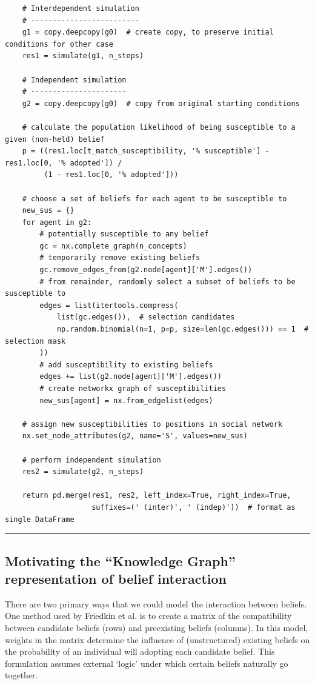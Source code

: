 \documentclass{article}
\begin{document}
\begin{verbatim}
    # Interdependent simulation
    # -------------------------
    g1 = copy.deepcopy(g0)  # create copy, to preserve initial conditions for other case
    res1 = simulate(g1, n_steps)

    # Independent simulation
    # ----------------------
    g2 = copy.deepcopy(g0)  # copy from original starting conditions

    # calculate the population likelihood of being susceptible to a given (non-held) belief
    p = ((res1.loc[t_match_susceptibility, '% susceptible'] - res1.loc[0, '% adopted']) /
         (1 - res1.loc[0, '% adopted']))

    # choose a set of beliefs for each agent to be susceptible to
    new_sus = {}
    for agent in g2:
        # potentially susceptible to any belief
        gc = nx.complete_graph(n_concepts)  
        # temporarily remove existing beliefs
        gc.remove_edges_from(g2.node[agent]['M'].edges())  
        # from remainder, randomly select a subset of beliefs to be susceptible to
        edges = list(itertools.compress(
            list(gc.edges()),  # selection candidates
            np.random.binomial(n=1, p=p, size=len(gc.edges())) == 1  # selection mask
        ))
        # add susceptibility to existing beliefs
        edges += list(g2.node[agent]['M'].edges())  
        # create networkx graph of susceptibilities
        new_sus[agent] = nx.from_edgelist(edges)  

    # assign new susceptibilities to positions in social network
    nx.set_node_attributes(g2, name='S', values=new_sus)  
    
    # perform independent simulation
    res2 = simulate(g2, n_steps)  

    return pd.merge(res1, res2, left_index=True, right_index=True,
                    suffixes=(' (inter)', ' (indep)'))  # format as single DataFrame

\end{verbatim}

\hrule

\subsection{Motivating the ``Knowledge Graph'' representation of belief interaction}
There are two primary ways that we could model the interaction between beliefs. One method used by Friedkin et al. \cite{friedkin2016network} is to create a matrix of the compatibility between candidate beliefs (rows) and preexisting beliefs (columns). In this model, weights in the matrix determine the influence of (unstructured) existing beliefs on the probability of an individual will adopting each candidate belief. This formulation assumes external `logic' under which certain beliefs naturally go together. 
\end{document}
